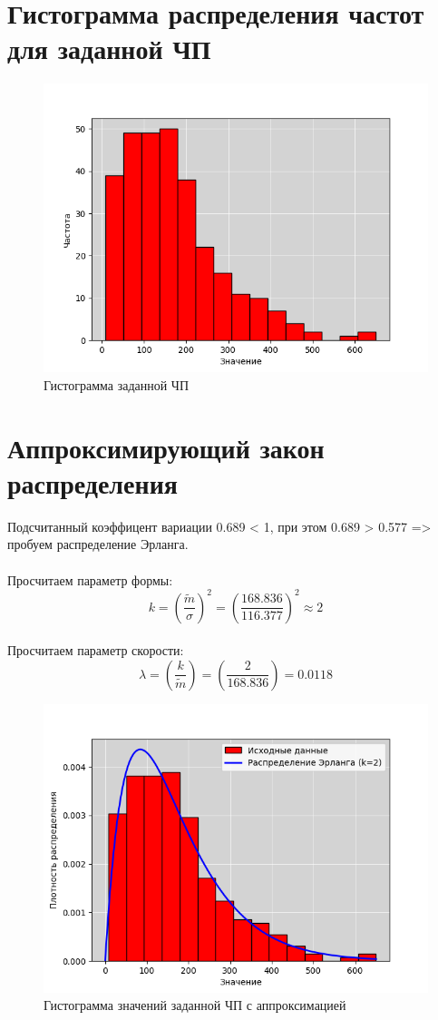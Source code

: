 \documentclass{article}
\begin{document}
\section{Гистограмма распределения частот для заданной ЧП}

\begin{figure}[ht]
    \centering
    \includegraphics[width=.7\textwidth]{2}
    \caption{Гистограмма заданной ЧП}
\end{figure}


\section{Аппроксимирующий закон распределения}

Подсчитанный коэффицент вариации 0.689 < 1, при этом 0.689 > 0.577 => пробуем распределение Эрланга.
\\\\
Просчитаем параметр формы:
\[k = \left(\frac{\widetilde{m}}{\sigma}\right)^2 = \left(\frac{168.836}{116.377}\right)^2 \approx 2 \]
\\
Просчитаем параметр скорости:
\[\lambda = \left(\frac{k}{\widetilde{m}}\right) = \left(\frac{2}{168.836}\right) = 0.0118 \]
\begin{figure}[ht]
    \centering
    \includegraphics[width=.7\textwidth]{6}
    \caption{Гистограмма значений заданной ЧП с аппроксимацией}
\end{figure}
\end{document}
